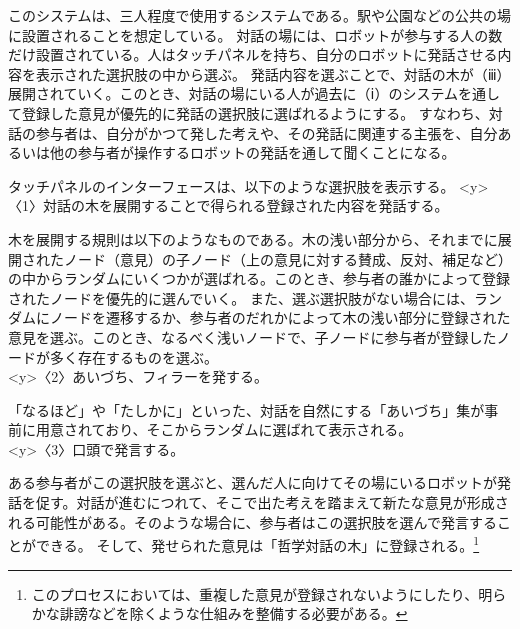 \documentclass[9pt,b5j,twoside,twocolumn]{utarticle}
\begin{document}
このシステムは、三人程度で使用するシステムである。駅や公園などの公共の場に設置されることを想定している。
対話の場には、ロボットが参与する人の数だけ設置されている。人はタッチパネルを持ち、自分のロボットに発話させる内容を表示された選択肢の中から選ぶ。
発話内容を選ぶことで、対話の木が（ⅲ）展開されていく。このとき、対話の場にいる人が過去に（ⅰ）のシステムを通して登録した意見が優先的に発話の選択肢に選ばれるようにする。
すなわち、対話の参与者は、自分がかつて発した考えや、その発話に関連する主張を、自分あるいは他の参与者が操作するロボットの発話を通して聞くことになる。


タッチパネルのインターフェースは、以下のような選択肢を表示する。
\pbox<y>{〈1〉}対話の木を展開することで得られる登録された内容を発話する。


木を展開する規則は以下のようなものである。木の浅い部分から、それまでに展開されたノード（意見）の子ノード（上の意見に対する賛成、反対、補足など）の中からランダムにいくつかが選ばれる。このとき、参与者の誰かによって登録されたノードを優先的に選んでいく。
また、選ぶ選択肢がない場合には、ランダムにノードを遷移するか、参与者のだれかによって木の浅い部分に登録された意見を選ぶ。このとき、なるべく浅いノードで、子ノードに参与者が登録したノードが多く存在するものを選ぶ。\\\pbox<y>{〈2〉}あいづち、フィラーを発する。


「なるほど」や「たしかに」といった、対話を自然にする「あいづち」集が事前に用意されており、そこからランダムに選ばれて表示される。\\
\pbox<y>{〈3〉}口頭で発言する。


ある参与者がこの選択肢を選ぶと、選んだ人に向けてその場にいるロボットが発話を促す。対話が進むにつれて、そこで出た考えを踏まえて新たな意見が形成される可能性がある。そのような場合に、参与者はこの選択肢を選んで発言することができる。
そして、発せられた意見は「哲学対話の木」に登録される。\footnote{このプロセスにおいては、重複した意見が登録されないようにしたり、明らかな誹謗などを除くような仕組みを整備する必要がある。}
\end{document}
